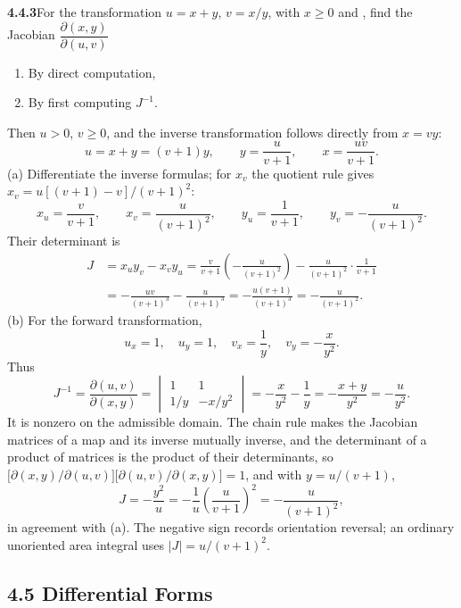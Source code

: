 \par\bigskip
\noindent\textbf{4.4.3}\quad For the transformation $u=x+y$, $v=x/y$, with
$x\ge0$ and , find the Jacobian
$\dfrac{\partial(x,y)}{\partial(u,v)}$
\begin{enumerate}
\item[(a)] By direct computation,
\item[(b)] By first computing $J^{-1}$.
\end{enumerate}
\solution
{} Then $u>0$,
$v\ge0$, and the inverse transformation follows directly from
$x=vy$:
\[
u=x+y=(v+1)y,\qquad
\boxed{y=\frac{u}{v+1},\qquad x=\frac{uv}{v+1}}.
\]
(a) Differentiate the inverse formulas; for $x_v$ the quotient rule
gives $x_v=u[(v+1)-v]/(v+1)^2$:
\[
x_u=\frac{v}{v+1},\qquad x_v=\frac{u}{(v+1)^2},\qquad
y_u=\frac1{v+1},\qquad y_v=-\frac{u}{(v+1)^2}.
\]
Their determinant is
\begin{align*}
J&=x_uy_v-x_vy_u
 =\frac{v}{v+1}\left(-\frac{u}{(v+1)^2}\right)
  -\frac{u}{(v+1)^2}\cdot\frac1{v+1}\\
 &=-\frac{uv}{(v+1)^3}-\frac{u}{(v+1)^3}
 =-\frac{u(v+1)}{(v+1)^3}
 =\boxed{-\frac{u}{(v+1)^2}}.
\end{align*}
(b) For the forward transformation,
\[
u_x=1,\quad u_y=1,\quad v_x=\frac1y,\quad v_y=-\frac{x}{y^2}.
\]
Thus
\[
J^{-1}=\frac{\partial(u,v)}{\partial(x,y)}
=\begin{vmatrix}1&1\\1/y&-x/y^2\end{vmatrix}
=-\frac{x}{y^2}-\frac1y
=-\frac{x+y}{y^2}=-\frac{u}{y^2}.
\]
It is nonzero on the admissible domain. The chain rule makes the
Jacobian matrices of a map and its inverse mutually inverse, and the
determinant of a product of matrices is the product of their
determinants, so
$\bigl[\partial(x,y)/\partial(u,v)\bigr]\bigl[\partial(u,v)/\partial(x,y)\bigr]=1$,
and with $y=u/(v+1)$,
\[
J=-\frac{y^2}{u}
=-\frac1u\left(\frac{u}{v+1}\right)^2
=-\frac{u}{(v+1)^2},
\]
in agreement with (a). The negative sign records orientation reversal;
an ordinary unoriented area integral uses $|J|=u/(v+1)^2$.

\subsection*{4.5 Differential Forms}

